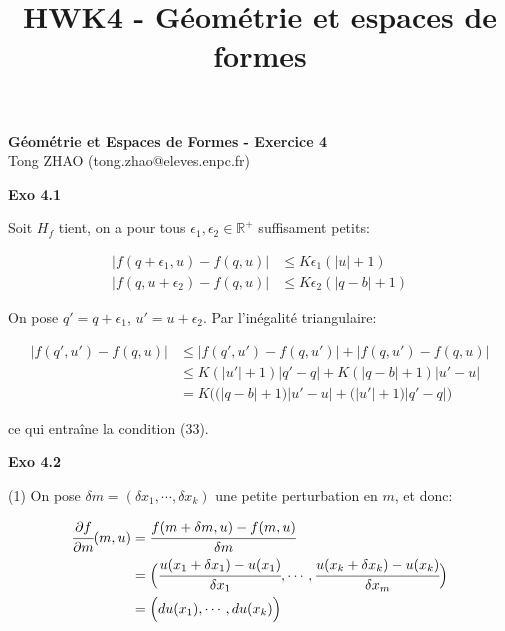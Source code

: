 \documentclass[11pt]{article}
\begin{document}
    
    \title{HWK4 - Géométrie et espaces de formes}
    
    \thispagestyle{empty}
    
    \begin{center}
    {\LARGE \bf Géométrie et Espaces de Formes - Exercice 4}\\
    \vspace{1em}
    {\large Tong ZHAO (tong.zhao@eleves.enpc.fr)}\\
    \end{center}

    \textbf{Exo 4.1}

    Soit $H_f$ tient, on a pour tous $\epsilon_1, \epsilon_2 \in \mathbb{R}^+$ suffisament petits:

    \vspace{-5em}
    \begin{align*} 
      |f(q+\epsilon_1, u) - f(q,u)| &\le K\epsilon_1 (|u| + 1) \\
      |f(q, u+\epsilon_2) - f(q,u)| &\le K\epsilon_2 (|q-b|+1)
    \end{align*}
    \vspace{-4em}

    On pose $q' = q + \epsilon_1$, $u' = u + \epsilon_2$. Par l'inégalité triangulaire:

    \vspace{-5em}
    \begin{align*} 
      |f(q', u') - f(q,u)| &\le |f(q', u') - f(q,u')| + |f(q, u') - f(q,u)| \\ 
       &\le K(|u'| + 1)|q'-q| + K(|q-b|+1)|u'-u| \\
       &= K\Big(\big(|q-b|+1 \big)|u'-u| + \big(|u'|+1 \big) |q'-q| \Big)
    \end{align*}
    \vspace{-4em}

    ce qui entraîne la condition (33).

    \textbf{Exo 4.2}

    (1) On pose $\delta m = (\delta x_1, \cdots , \delta x_k)$ une petite perturbation en $m$, et donc:

    \vspace{-4em}
    \begin{align*} 
      \cfrac{\partial f}{\partial m} (m, u) &= \cfrac{f(m+\delta m, u ) - f(m,u)}{\delta m} \\
      &= \Big( \cfrac{u(x_1 + \delta x_1) - u(x_1)}{\delta x_1}, \cdots, \cfrac{u(x_k + \delta x_k) - u(x_k)}{\delta x_m}  \Big ) \\
      &= \Big ( du(x_1), \cdots, du(x_k) \Big )
    \end{align*}
    \vspace{-4em}
\end{document}
